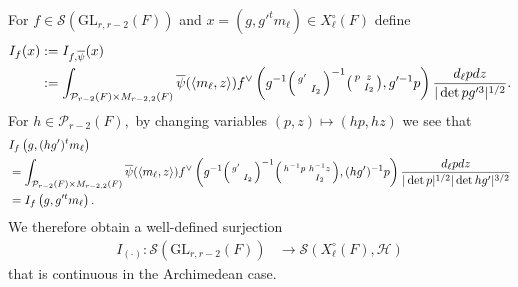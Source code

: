 \documentclass[12pt]{amsart}
\theoremstyle{remark}
\numberwithin{equation}{section}
\newcommand{\GL}{\mathrm{GL}}
\newcommand{\lto}{\longrightarrow}
\theoremstyle{definition}
\newenvironment{psmatrix}
  {\left(\begin{smallmatrix}}
  {\end{smallmatrix}\right)}
\numberwithin{equation}{subsection}
\begin{document}
For $f \in \mathcal{S}(\GL_{r,r-2}(F) )$ and $x=(g,g'^tm_\ell) \in X_\ell^\circ(F)$  define 
\begin{align} \label{If} \begin{split}
I_f(x)&:=I_{f,\overline{\psi}}(x)\\
&:=\int_{\mathcal{P}_{r-2}(F) \times M_{r-2,2}(F)}\overline{\psi}(\langle m_{\ell} ,z \rangle)f^\vee\left(g^{-1}\begin{psmatrix} g' & \\ & I_2 \end{psmatrix}^{-1}\begin{psmatrix}p & z\\ & I_2 \end{psmatrix},g'^{-1}p\right) \frac{d_\ell p dz}{|\det p g'^3|^{1/2}}
.\end{split}
\end{align} 
For $h\in \mathcal{P}_{r-2}(F),$ by changing variables $(p,z)\mapsto (hp,hz)$ we see that
\begin{align*}
    &I_f\left(g,(hg')^tm_{\ell}\right)\\
    &=\int_{\mathcal{P}_{r-2}(F) \times M_{r-2,2}(F)}\overline{\psi}(\langle m_{\ell} ,z \rangle)f^\vee\left(g^{-1}\begin{psmatrix} g' & \\ & I_2 \end{psmatrix}^{-1}\begin{psmatrix}h^{-1}p & h^{-1}z\\ & I_2 \end{psmatrix},(hg')^{-1}p\right) \frac{d_\ell p dz}{|\det p|^{1/2}|\det hg'|^{3/2}}\\
    &=I_f\left(g,g'^tm_{\ell}\right).
\end{align*}
We therefore obtain a well-defined surjection
 \begin{align} \label{I1}
     I_{(\cdot)}:\mathcal{S}(\GL_{r,r-2}(F)) &\lto \mathcal{S}(X^\circ_\ell(F) ,\mathcal{H})
 \end{align}
that is continuous in the Archimedean case.  
\end{document}
